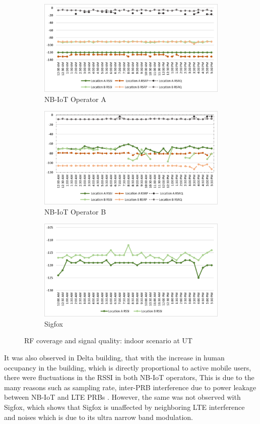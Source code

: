 \documentclass[12pt]{article}
\begin{document}
 \begin{figure}[h!]
\begin{subfigure}[t]{\linewidth}
  \centering
  \includegraphics[width=.5\linewidth]{Images/tartu/ATartuIndoor.pdf}  
  \caption{NB-IoT Operator A}
\end{subfigure}
\begin{subfigure}[t]{\linewidth}
  \centering
  \includegraphics[width=.5\linewidth]{Images/tartu/BTartuIndoor.pdf}  
  \caption{NB-IoT Operator B}
  
\end{subfigure}
\begin{subfigure}[t]{\linewidth}
  \centering
  \includegraphics[width=.5\linewidth]{Images/tartu/STartuIndoor.pdf}  
\caption{Sigfox}
 \end{subfigure}
\caption{RF coverage and signal quality: indoor scenario at UT}
 \label{RFIndoor Tartu}
\end{figure}

It was also observed in Delta building, that with the increase in human occupancy in the building, which is directly proportional to active mobile users, there were fluctuations in the RSSI in both NB-IoT operators, This is due to the many reasons such as sampling rate, inter-PRB interference due to power leakage between NB-IoT and LTE PRBs \cite{mwakwata2019narrowband}. However, the same was not observed with Sigfox, which shows that Sigfox is unaffected by neighboring LTE interference and noises which is due to its ultra narrow band modulation.
\end{document}
